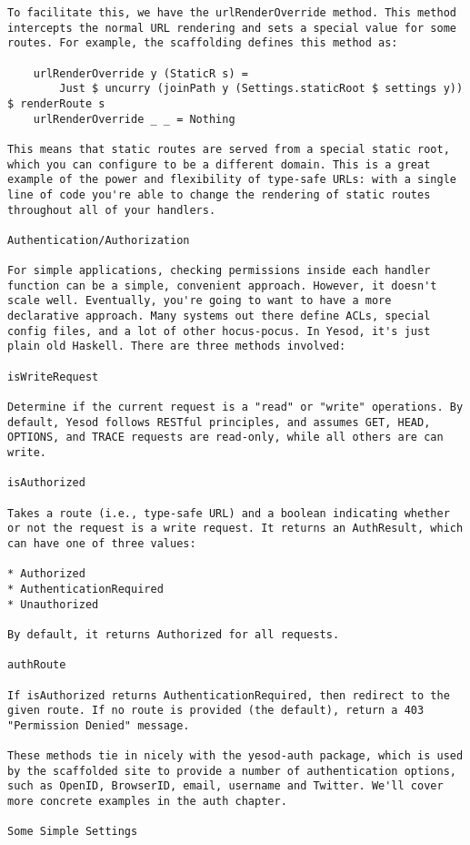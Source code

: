 \begin{lstlisting}
To facilitate this, we have the urlRenderOverride method. This method intercepts the normal URL rendering and sets a special value for some routes. For example, the scaffolding defines this method as:

    urlRenderOverride y (StaticR s) =
        Just $ uncurry (joinPath y (Settings.staticRoot $ settings y)) $ renderRoute s
    urlRenderOverride _ _ = Nothing

This means that static routes are served from a special static root, which you can configure to be a different domain. This is a great example of the power and flexibility of type-safe URLs: with a single line of code you're able to change the rendering of static routes throughout all of your handlers.

Authentication/Authorization

For simple applications, checking permissions inside each handler function can be a simple, convenient approach. However, it doesn't scale well. Eventually, you're going to want to have a more declarative approach. Many systems out there define ACLs, special config files, and a lot of other hocus-pocus. In Yesod, it's just plain old Haskell. There are three methods involved:

isWriteRequest

Determine if the current request is a "read" or "write" operations. By default, Yesod follows RESTful principles, and assumes GET, HEAD, OPTIONS, and TRACE requests are read-only, while all others are can write.

isAuthorized

Takes a route (i.e., type-safe URL) and a boolean indicating whether or not the request is a write request. It returns an AuthResult, which can have one of three values:

* Authorized
* AuthenticationRequired
* Unauthorized

By default, it returns Authorized for all requests.

authRoute

If isAuthorized returns AuthenticationRequired, then redirect to the given route. If no route is provided (the default), return a 403 "Permission Denied" message.

These methods tie in nicely with the yesod-auth package, which is used by the scaffolded site to provide a number of authentication options, such as OpenID, BrowserID, email, username and Twitter. We'll cover more concrete examples in the auth chapter.

Some Simple Settings


\end{lstlisting}
